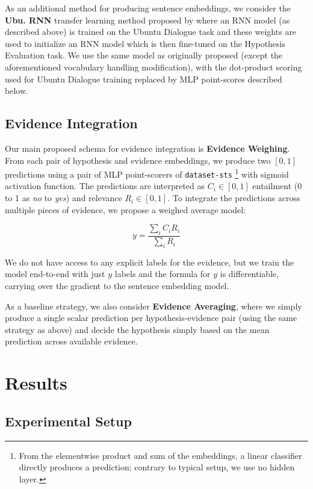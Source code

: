 \documentclass[11pt]{article}
\begin{document}
As an additional method for producing sentence embeddings, we consider
the \textbf{Ubu. RNN} transfer learning method proposed by \cite{sps} where an RNN model
(as described above) is trained on the Ubuntu Dialogue task \cite{UbuntuLowe}
and these weights are used to initialize an RNN model which is then fine-tuned
on the Hypothesis Evaluation task.  We use the same model as originally proposed (except the aforementioned vocabulary handling modification),
with the dot-product scoring used for Ubuntu Dialogue training replaced by MLP point-scores described below.

\subsection{Evidence Integration}

Our main proposed schema for evidence integration is \textbf{Evidence Weighing}.
From each pair of hypothesis and evidence embeddings, we produce two $[0,1]$
predictions using a pair of MLP point-scorers of \texttt{dataset-sts} \cite{sps}%
\footnote{From the elementwise product
and sum of the embeddings, a linear classifier directly produces a prediction;
contrary to typical setup, we use no hidden layer.}
with sigmoid activation function.  The predictions are interpreted as $C_i \in [0,1]$
entailment (0 to 1 as \textit{no} to \textit{yes}) and relevance $R_i \in [0,1]$.
To integrate the predictions across multiple pieces of evidence,
we propose a weighed average model:

$$ y  = \frac{\sum_i C_iR_i}{\sum_i R_i} $$

We do not have access to any explicit labels for the evidence,
but we train the model end-to-end with just $y$ labels and the formula
for $y$ is differentiable, carrying over the gradient to the sentence
embedding model.

As a baseline strategy, we also consider \textbf{Evidence Averaging}, where
we simply produce a single scalar prediction per hypothesis-evidence pair
(using the same strategy as above) and decide the hypothesis simply based
on the mean prediction across available evidence.

\section{Results}
\label{sec:res}

\subsection{Experimental Setup}
\end{document}
